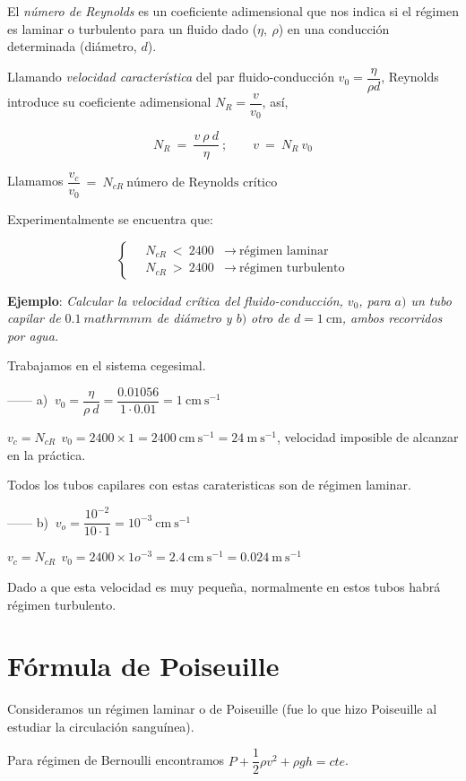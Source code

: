 El \emph{número de Reynolds} es un coeficiente adimensional que nos indica si el régimen es laminar o turbulento para un fluido dado ($\eta,\ \rho$) en una conducción determinada (diámetro, $d$).

Llamando \emph{velocidad característica} del par fluido-conducción $v_0=\dfrac{\eta}{\rho d}$, Reynolds introduce su coeficiente adimensional $N_R=\dfrac {v}{v_0}$, así, 


$$N_R\ = \ \dfrac{v\ \rho \ d}{\eta} \ ; \qquad v\ = \ N_R\ v_0$$

Llamamos $\dfrac{v_c}{v_0}\ = \ N_{cR}\ \text{número de Reynolds crítico}$

Experimentalmente se encuentra que:

$$\begin{cases} \quad N_{cR}\ < \ 2400 & \to \ \text{régimen laminar}  \\  \quad N_{cR}\ > \ 2400 & \to \ \text{régimen turbulento}  \end{cases}$$

\textbf{Ejemplo}: \emph{Calcular la velocidad crítica del fluido-conducción, $v_0$, para $a)$ un tubo capilar de $0.1\ mathrm{mm}$ de diámetro y $b)$ otro de $d=1\ \mathrm{cm}$, ambos recorridos por agua.}

Trabajamos en el sistema cegesimal.

------ a) $\ v_0=\dfrac {\eta}{\rho \ d}=\dfrac{0.01056}{1\cdot 0.01}=1 \ \mathrm{cm\ s}^{-1}$

$v_c=N_{cR} \ \ v_0=2400 \times 1 =2400 \ \mathrm{cm\ s}^{-1}= 24 \ \mathrm{m\ s}^{-1}$, velocidad imposible de alcanzar en la práctica. 

Todos los tubos capilares con estas carateristicas son de régimen laminar.

------ b) $\ v_o=\dfrac{10^{-2}}{10\cdot 1}=10^{-3} \ \mathrm{cm\ s}^{-1}$

$v_c=N_{cR} \ \ v_0=2400 \times 1o^{-3} =2.4 \ \mathrm{cm\ s}^{-1}= 0.024 \ \mathrm{m\ s}^{-1}$ 

Dado a que esta velocidad es muy pequeña, normalmente en estos tubos habrá régimen turbulento.

\section{Fórmula de Poiseuille}

Consideramos un régimen laminar o de Poiseuille (fue lo que hizo Poiseuille al estudiar la circulación sanguínea).

Para régimen de Bernoulli encontramos $ P+\dfrac 1 2 \rho v^2 + \rho g h = cte$.

